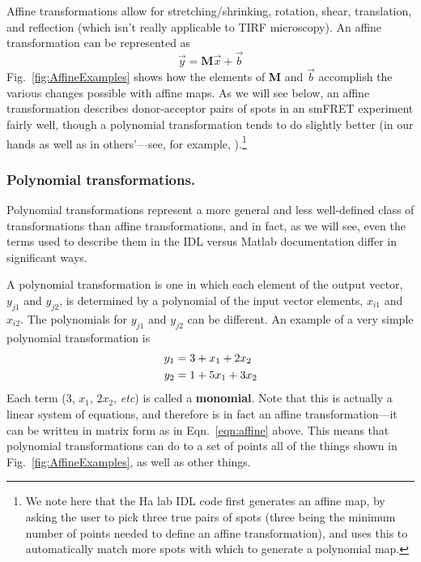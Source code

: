 \documentclass[11pt]{article}
\begin{document}
Affine transformations allow for stretching/shrinking, rotation, shear, translation, and reflection (which isn't really applicable to TIRF microscopy).  An affine transformation can be represented as 
\begin{equation}
\vec{y} = \mathbf{M}\vec{x} + \vec{b}\label{eqn:affine}
\end{equation}
Fig.~\ref{fig:AffineExamples} shows how the elements of {\bf M} and $\vec{b}$ accomplish the various changes possible with affine maps.  As we will see below, an affine transformation describes donor-acceptor pairs of spots in an smFRET experiment fairly well, though a polynomial transformation tends to do slightly better (in our hands as well as in others'---see, for example, \cite{Joo2007,Deindl2012}).\footnote{We note here that the Ha lab IDL code first generates an affine map, by asking the user to pick three true pairs of spots (three being the minimum number of points needed to define an affine transformation), and uses this to automatically match more spots with which to generate a polynomial map.}

\subsubsection{Polynomial transformations.}

Polynomial transformations represent a more general and less well-defined class of transformations than affine transformations, and in fact, as we will see, even the terms used to describe them in the IDL versus Matlab documentation differ in significant ways.  

A polynomial transformation is one in which each element of the output vector, $y_{j1}$ and $y_{j2}$, is determined by a polynomial of the input vector elements, $x_{i1}$ and $x_{i2}$.  The polynomials for $y_{j1}$ and $y_{j2}$ can be different. An example of a very simple polynomial transformation is 
\begin{align}
      y_1 &=  3+x_1+2x_2\\\notag
      y_2 &= 1+5x_1+ 3x_2
\end{align}
Each term (3, $x_1$, $2x_2$, {\it etc}) is called a {\bf monomial}.  Note that this is actually a linear system of equations, and therefore is in fact an affine transformation---it can be written in matrix form as in Eqn.~\eqref{eqn:affine} above.  This means that polynomial transformations can do to a set of points all of the things shown in Fig.~\ref{fig:AffineExamples}, as well as other things.
\end{document}
